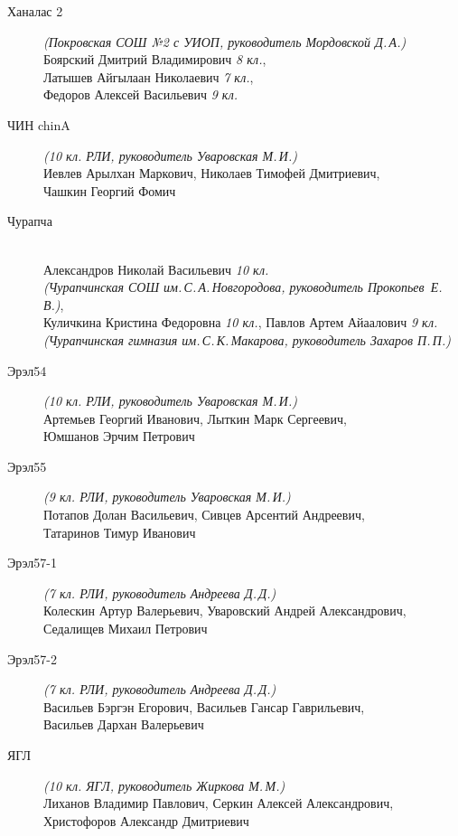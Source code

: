 \begin{description}
\item[Ханалас 2] \textit{(Покровская СОШ №2 с УИОП, руководитель Мордовской Д.\,А.)} \\
Боярский Дмитрий Владимирович \textit{8 кл.}, \\
Латышев Айгылаан Николаевич \textit{7 кл.}, \\
Федоров Алексей Васильевич \textit{9 кл.}

\item[ЧИН chinA] \textit{(10 кл. РЛИ, руководитель Уваровская М.\,И.)} \\
Иевлев Арылхан Маркович, Николаев Тимофей Дмитриевич, \\
Чашкин Георгий Фомич

\item[Чурапча] ~ \\
Александров Николай Васильевич \textit{10 кл. \\
(Чурапчинская СОШ им.\,С.\,А.\,Новгородова, руководитель Прокопьев~Е.\,В.)}, \\
Куличкина Кристина Федоровна \textit{10 кл.},
Павлов Артем Айаалович \textit{9 кл. (Чурапчинская гимназия им.\,С.\,К.\,Макарова, руководитель Захаров П.\,П.)}

\item[Эрэл54] \textit{(10 кл. РЛИ, руководитель Уваровская М.\,И.)} \\
Артемьев Георгий Иванович, Лыткин Марк Сергеевич, \\
Юмшанов Эрчим Петрович

\item[Эрэл55] \textit{(9 кл. РЛИ, руководитель Уваровская М.\,И.)} \\
Потапов Долан Васильевич, Сивцев Арсентий Андреевич, \\
Татаринов Тимур Иванович

\item[Эрэл57-1] \textit{(7 кл. РЛИ, руководитель Андреева Д.\,Д.)} \\
Колескин Артур Валерьевич, Уваровский Андрей Александрович, \\
Седалищев Михаил Петрович

\item[Эрэл57-2] \textit{(7 кл. РЛИ, руководитель Андреева Д.\,Д.)} \\
Васильев Бэргэн Егорович, Васильев Гансар Гаврильевич, \\
Васильев Дархан Валерьевич

\item[ЯГЛ] \textit{(10 кл. ЯГЛ, руководитель Жиркова М.\,М.)} \\
Лиханов Владимир Павлович, Серкин Алексей Александрович, \\
Христофоров Александр Дмитриевич


\end{description}
